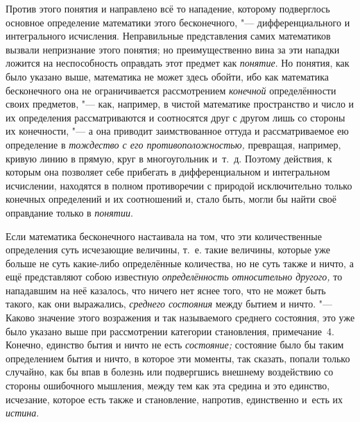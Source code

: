 Против этого понятия и направлено всё то нападение, которому подверглось
основное определение математики этого бесконечного, "--- дифференциального и
интегрального исчисления. Неправильные представления самих математиков вызвали
непризнание этого понятия; но преимущественно вина за эти нападки ложится на
неспособность оправдать этот предмет как {\em понятие}. Но понятия, как было
указано выше, математика не может здесь обойти, ибо как математика бесконечного
она не ограничивается рассмотрением {\em конечной} определённости своих
предметов, "--- как, например, в чистой математике пространство и число и их
определения рассматриваются и соотносятся друг с другом лишь со стороны их
конечности, "--- а она приводит заимствованное оттуда и рассматриваемое ею
определение в {\em тождество с его противоположностью,} превращая, например,
кривую линию в прямую, круг в многоугольник и~т.~д. Поэтому действия, к которым
она позволяет себе прибегать в дифференциальном и интегральном исчислении,
находятся в полном противоречии с природой исключительно только конечных
определений и их соотношений и, стало быть, могли бы найти своё оправдание
только в {\em понятии}.

Если математика бесконечного настаивала на том, что эти количественные
определения суть исчезающие величины, т.~е. такие величины, которые уже больше
не суть какие-либо определённые количества, но не суть также и ничто, а ещё
представляют собою известную {\em определённость относительно другого,} то
нападавшим на неё казалось, что ничего нет яснее того, что не может быть
такого, как они выражались, {\em среднего состояния} между бытием и ничто. "---
Каково значение этого возражения и так называемого среднего состояния, это уже
было указано выше при рассмотрении категории становления, примечание~4.
Конечно, единство бытия и ничто не есть {\em состояние;} состояние было бы
таким определением бытия и ничто, в которое эти моменты, так сказать, попали
только случайно, как бы впав в болезнь или подвергшись внешнему воздействию
со стороны ошибочного мышления, между тем как эта средина и это единство,
исчезание, которое есть также и становление, напротив, единственно
и~есть их {\em истина}.

